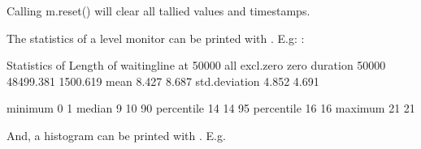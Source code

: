 \documentclass[letterpaper,10pt,english]{sphinxmanual}
\begin{document}
Calling m.reset() will clear all tallied values and timestamps.

The statistics of a level monitor can be printed with .
E.g: :

%
\begin{sphinxVerbatim}[commandchars=\\\{\}]
Statistics of Length of waitingline at     50000
                        all    excl.zero         zero
\PYGZhy{}\PYGZhy{}\PYGZhy{}\PYGZhy{}\PYGZhy{}\PYGZhy{}\PYGZhy{}\PYGZhy{}\PYGZhy{}\PYGZhy{}\PYGZhy{}\PYGZhy{}\PYGZhy{}\PYGZhy{} \PYGZhy{}\PYGZhy{}\PYGZhy{}\PYGZhy{}\PYGZhy{}\PYGZhy{}\PYGZhy{}\PYGZhy{}\PYGZhy{}\PYGZhy{}\PYGZhy{}\PYGZhy{} \PYGZhy{}\PYGZhy{}\PYGZhy{}\PYGZhy{}\PYGZhy{}\PYGZhy{}\PYGZhy{}\PYGZhy{}\PYGZhy{}\PYGZhy{}\PYGZhy{}\PYGZhy{} \PYGZhy{}\PYGZhy{}\PYGZhy{}\PYGZhy{}\PYGZhy{}\PYGZhy{}\PYGZhy{}\PYGZhy{}\PYGZhy{}\PYGZhy{}\PYGZhy{}\PYGZhy{}
duration          50000        48499.381     1500.619
mean                  8.427        8.687
std.deviation         4.852        4.691

minimum               0            1
median                9           10
90\PYGZpc{} percentile       14           14
95\PYGZpc{} percentile       16           16
maximum              21           21
\end{sphinxVerbatim}

And, a histogram can be printed with . E.g.

%
\begin{sphinxVerbatim}[commandchars=\\\{\}]
  
\end{sphinxVerbatim}
\end{document}
